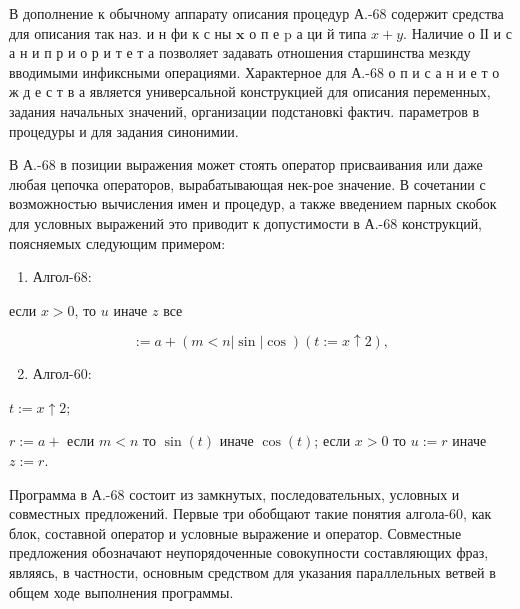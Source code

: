 \documentclass[10pt]{article}
\begin{document}
В дополнение к обычному аппарату описания процедур А.-68 содержит средства для описания так наз. и н фи к с ны $\mathbf{x}$ о п е $\mathrm{p}$ а ци й типа $x+y$. Наличие о ІІ и с а н и п р и о р и т е т а позволяет задавать отношения старшинства мезкду вводимыми инфиксными операциями. Характерное для А.-68 о п и с а н и е т о ж д е с т в а является универсальной конструкцией для описания переменных, задания начальных значений, организации подстановкі фактич. параметров в процедуры и для задания синонимии.



В А.-68 в позиции выражения может стоять оператор присваивания или даже любая цепочка операторов, вырабатывающая нек-рое значение. В сочетании с возможностью вычисления имен и процедур, а также введением парных скобок для условных выражений это приводит к допустимости в А.-68 конструкций, поясняемых следующим примером:



\begin{enumerate}

  \item Алгол-68:

\end{enumerate}



если $x>0$, то $u$ иначе $z$ все



\[

:=a+(m<n|\sin | \cos )(t:=x \uparrow 2),

\]



\begin{enumerate}

  \setcounter{enumi}{1}

  \item Алгол-60:

\end{enumerate}



$t:=x \uparrow 2 ;$



$r:=a+$ если $m<n$ то $\sin (t)$ иначе $\cos (t)$; если $x>0$ то $u:=r$ иначе $z:=r$.



Программа в А.-68 состоит из замкнутых, последовательных, условных и совместных предложений. Первые три обобщают такие понятия алгола-60, как блок, составной оператор и условные выражение и оператор. Совместные предложения обозначают неупорядоченные совокупности составляющих фраз, являясь, в частности, основным средством для указания параллельных ветвей в общем ходе выполнения программы.
\end{document}
